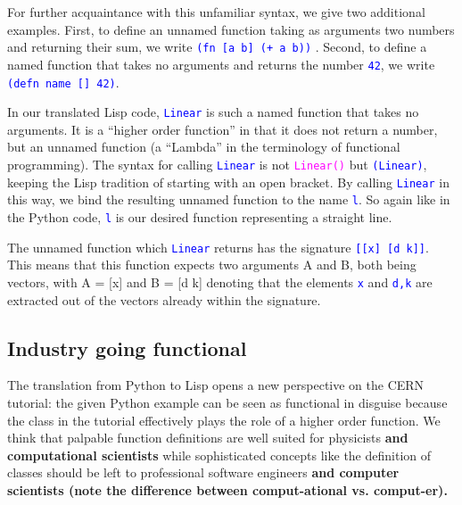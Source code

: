 \documentclass[twocolumn]{article}
\begin{document}
For further acquaintance with this unfamiliar syntax, we give two additional examples. First, to define an unnamed function taking as arguments two numbers and returning their sum, we write \texttt{\textcolor{blue}{(fn [a b] (+ a b))}} . Second, to define a named function that takes no arguments and returns the number \texttt{\textcolor{blue}{42}}, we write \texttt{\textcolor{blue}{(defn name [] 42)}}.

In our translated Lisp code, \texttt{\textcolor{blue}{Linear}} is such a named function that takes no arguments. It is a “higher order function” in that it does not return a number, but an unnamed function (a “Lambda” in the terminology of functional programming). The syntax for calling \texttt{\textcolor{blue}{Linear}} is not \texttt{\textcolor{magenta}{Linear()}} but \texttt{\textcolor{blue}{(Linear)}}, keeping the Lisp tradition of starting with an open bracket. By calling \texttt{\textcolor{blue}{Linear}} in this way, we bind the resulting unnamed function to the name \texttt{\textcolor{blue}{l}}. So again like in the Python code, \texttt{\textcolor{blue}{l}} is our desired function representing a straight line. 

The unnamed function which \texttt{\textcolor{blue}{Linear}} returns has the signature \texttt{\textcolor{blue}{[[x] [d k]]}}. This means that this function expects two arguments A and B, both being vectors, with A = [x] and B = [d k] denoting that the elements \texttt{\textcolor{blue}{x}} and \texttt{\textcolor{blue}{d,k}} are extracted out of the vectors already within the signature.

\subsection{Industry going functional}
The translation from Python to Lisp opens a new perspective on the CERN tutorial: the given Python example can be seen as functional in disguise because the class in the tutorial effectively plays the role of a higher order function. We think that palpable function definitions are well suited for physicists \textbf{and computational scientists} while sophisticated concepts like the definition of classes should be left to  professional software engineers \textbf{and computer scientists (note the difference between comput-ational vs. comput-er).}
\end{document}
